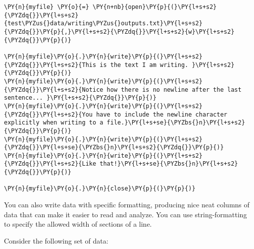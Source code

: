    \begin{tcolorbox}[breakable, size=fbox, boxrule=1pt, pad at break*=1mm,colback=cellbackground, colframe=cellborder]
\begin{Verbatim}[commandchars=\\\{\}]
\PY{n}{myfile} \PY{o}{=} \PY{n+nb}{open}\PY{p}{(}\PY{l+s+s2}{\PYZdq{}}\PY{l+s+s2}{test\PYZus{}data/writing\PYZus{}outputs.txt}\PY{l+s+s2}{\PYZdq{}}\PY{p}{,}\PY{l+s+s2}{\PYZdq{}}\PY{l+s+s2}{w}\PY{l+s+s2}{\PYZdq{}}\PY{p}{)}

\PY{n}{myfile}\PY{o}{.}\PY{n}{write}\PY{p}{(}\PY{l+s+s2}{\PYZdq{}}\PY{l+s+s2}{This is the text I am writing. }\PY{l+s+s2}{\PYZdq{}}\PY{p}{)}
\PY{n}{myfile}\PY{o}{.}\PY{n}{write}\PY{p}{(}\PY{l+s+s2}{\PYZdq{}}\PY{l+s+s2}{Notice how there is no newline after the last sentence... }\PY{l+s+s2}{\PYZdq{}}\PY{p}{)}
\PY{n}{myfile}\PY{o}{.}\PY{n}{write}\PY{p}{(}\PY{l+s+s2}{\PYZdq{}}\PY{l+s+s2}{You have to include the newline character explicitly when writing to a file.}\PY{l+s+se}{\PYZbs{}n}\PY{l+s+s2}{\PYZdq{}}\PY{p}{)}
\PY{n}{myfile}\PY{o}{.}\PY{n}{write}\PY{p}{(}\PY{l+s+s2}{\PYZdq{}}\PY{l+s+se}{\PYZbs{}n}\PY{l+s+s2}{\PYZdq{}}\PY{p}{)}
\PY{n}{myfile}\PY{o}{.}\PY{n}{write}\PY{p}{(}\PY{l+s+s2}{\PYZdq{}}\PY{l+s+s2}{Like that!}\PY{l+s+se}{\PYZbs{}n}\PY{l+s+s2}{\PYZdq{}}\PY{p}{)}

\PY{n}{myfile}\PY{o}{.}\PY{n}{close}\PY{p}{(}\PY{p}{)}
\end{Verbatim}
\end{tcolorbox}

    You can also write data with specific formatting, producing nice neat
columns of data that can make it easier to read and analyze. You can use
string-formatting to specify the allowed width of sections of a line.

Consider the following set of data:

